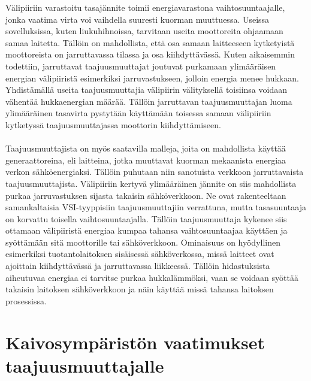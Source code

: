 \documentclass[finnish,12pt,a4paper,pdftex,elec,utf8]{aaltothesis}
\begin{document}
\noindent
Välipiiriin varastoitu tasajännite toimii energiavarastona vaihtosuuntaajalle, jonka vaatima virta voi vaihdella suuresti kuorman muuttuessa. Useissa sovelluksissa, kuten liukuhihnoissa, tarvitaan useita moottoreita ohjaamaan samaa laitetta. Tällöin on mahdollista, että osa samaan laitteeseen kytketyistä moottoreista on jarruttavassa tilassa ja osa kiihdyttävässä. Kuten aikaisemmin todettiin, jarruttavat taajuusmuuttajat joutuvat purkamaan ylimääräisen energian välipiiristä esimerkiksi jarruvastukseen, jolloin energia menee hukkaan. Yhdistämällä useita taajuusmuuttajia välipiirin välityksellä toisiinsa voidaan vähentää hukkaenergian määrää. Tällöin jarruttavan taajuusmuuttajan luoma ylimääräinen tasavirta pystytään käyttämään toisessa samaan välipiiriin kytketyssä taajuusmuuttajassa moottorin kiihdyttämiseen.
\\\\
Taajuusmuuttajista on myös saatavilla malleja, joita on mahdollista käyttää generaattoreina, eli laitteina, jotka muuttavat kuorman mekaanista energiaa verkon sähköenergiaksi. Tällöin puhutaan niin sanotuista verkkoon jarruttavaista taajuusmuuttajista. Välipiiriin kertyvä ylimääräinen jännite on siis mahdollista purkaa jarruvastuksen sijasta takaisin sähköverkkoon. Ne ovat rakenteeltaan samankaltaisia VSI-tyyppisiin taajuusmuuttajiin verrattuna, mutta tasasuuntaaja on korvattu toisella vaihtosuuntaajalla. Tällöin taajuusmuuttaja kykenee siis ottamaan välipiiristä energiaa kumpaa tahansa vaihtosuuntaajaa käyttäen ja syöttämään sitä moottorille tai sähköverkkoon. Ominaisuus on hyödyllinen esimerkiksi tuotantolaitoksen sisäisessä sähköverkossa, missä laitteet ovat ajoittain kiihdyttävässä ja jarruttavassa liikkeessä. Tällöin hidastuksista aiheutuvaa energiaa ei tarvitse purkaa hukkalämmöksi, vaan se voidaan syöttää takaisin laitoksen sähköverkkoon ja näin käyttää missä tahansa laitoksen prosessissa.




\clearpage

\section{Kaivosympäristön vaatimukset taajuusmuuttajalle}
\end{document}
